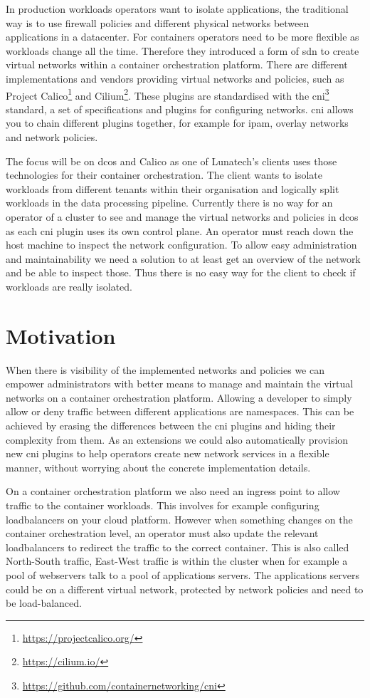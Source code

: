In production workloads operators want to isolate applications, the traditional way is to use firewall policies and different physical networks between applications in a datacenter. For containers operators need to be more flexible as workloads change all the time. Therefore they introduced a form of \gls{sdn} to create virtual networks within a container orchestration platform.  There are different implementations and vendors providing virtual networks and policies, such as Project Calico\footnote{\url{https://projectcalico.org/}} and Cilium\footnote{\url{https://cilium.io/}}. These plugins are standardised with the \gls{cni}\footnote{\url{https://github.com/containernetworking/cni}} standard, a set of specifications and plugins for configuring networks. \Gls{cni} allows you to chain different plugins together, for example for \gls{ipam}, overlay networks and network policies.

The focus will be on \gls{dcos} and Calico as one of Lunatech's clients uses those technologies for their container orchestration. The client wants to isolate workloads from different tenants within their organisation and logically split workloads in the data processing pipeline. Currently there is no way for an operator of a cluster to see and manage the virtual networks and policies in \gls{dcos} as each \gls{cni} plugin uses its own control plane. An operator must reach down the host machine to inspect the network configuration. To allow easy administration and maintainability we need a solution to at least get an overview of the network and be able to inspect those. Thus there is no easy way for the client to check if workloads are really isolated. 
\section{Motivation}
When there is visibility of the implemented networks and policies we can empower administrators with better means to manage and maintain the virtual networks on a container orchestration platform. Allowing a developer to simply allow or deny traffic between different applications are namespaces. This can be achieved by erasing the differences between the \gls{cni} plugins and hiding their complexity from them. As an extensions we could also automatically provision new \gls{cni} plugins to help operators create new network services in a flexible manner, without worrying about the concrete implementation details.

On a container orchestration platform we also need an ingress point to allow traffic to the container workloads. This involves for example configuring loadbalancers on your cloud platform. However when something changes on the container orchestration level, an operator must also update the relevant loadbalancers to redirect the traffic to the correct container. This is also called North-South traffic, East-West traffic is within the cluster when for example a pool of webservers talk to a pool of applications servers. The applications servers could be on a different virtual network, protected by network policies and need to be load-balanced.

